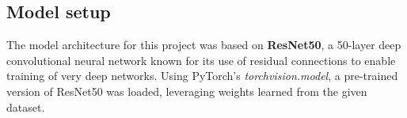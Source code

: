 
\subsection{Model setup}
The model architecture for this project was based on \textbf{ResNet50}, a 50-layer deep 
convolutional neural network known for its use of residual connections to enable training of very 
deep networks. Using PyTorch’s \textit{torchvision.model}, a pre-trained version of ResNet50 was 
loaded, leveraging weights learned from the given dataset.

